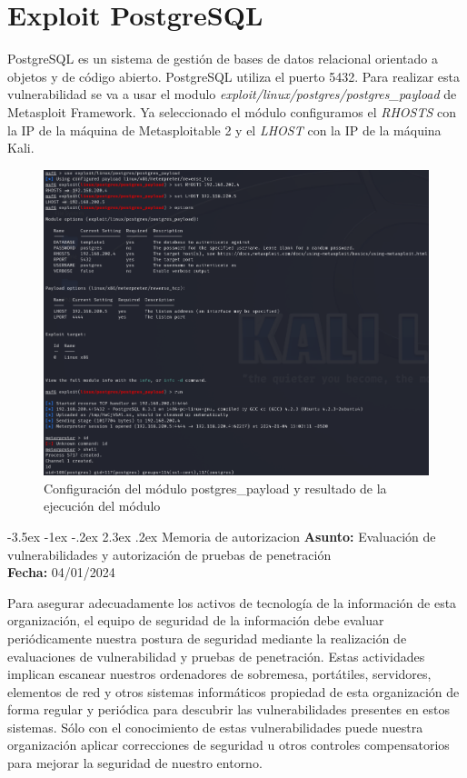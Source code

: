 \documentclass[11pt]{report}
\makeatletter
\renewcommand\chapter{\@startsection{chapter}{0}{\z@}%
    {-3.5ex \@plus -1ex \@minus -.2ex}%
    {2.3ex \@plus.2ex}%
    {\normalfont\Large\bfseries}}
\makeatother
\begin{document}
\section{Exploit PostgreSQL}
PostgreSQL es un sistema de gestión de bases de datos relacional orientado a objetos y de código abierto. PostgreSQL utiliza el puerto 5432. Para realizar esta vulnerabilidad
se va a usar el modulo \emph{exploit/linux/postgres/postgres\_payload} de Metasploit Framework. Ya seleccionado el módulo configuramos el \emph{RHOSTS} con la IP de la máquina de Metasploitable 2 y
el \emph{LHOST} con la IP de la máquina Kali.
\begin{figure}[H]
  \centering
  \includegraphics[scale=0.65]{img/postgresql.png}
  \caption{Configuración del módulo postgres\_payload y resultado de la ejecución del módulo}
\end{figure}


\newpage

\chapter{Memoria de autorizacion}
\textbf{Asunto:} Evaluación de vulnerabilidades y autorización de pruebas de penetración \\
\textbf{Fecha:} 04/01/2024 

Para asegurar adecuadamente los activos de tecnología de la información de esta organización, el equipo de seguridad de la información debe evaluar periódicamente nuestra postura de seguridad mediante la realización de evaluaciones de vulnerabilidad y pruebas de penetración. Estas actividades implican escanear nuestros ordenadores de sobremesa, portátiles, servidores, elementos de red y otros sistemas informáticos propiedad de esta organización de forma regular y periódica para descubrir las vulnerabilidades presentes en estos sistemas. Sólo con el conocimiento de estas vulnerabilidades puede nuestra organización aplicar correcciones de seguridad u otros controles compensatorios para mejorar la seguridad de nuestro entorno.
\end{document}
